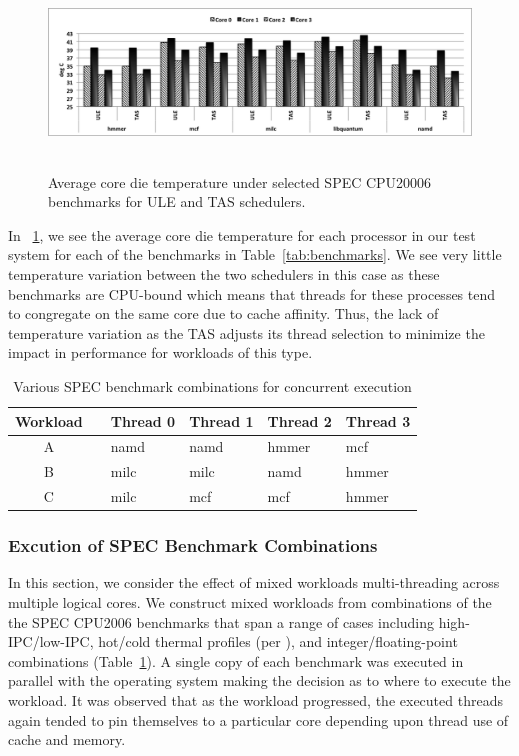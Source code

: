 \documentclass[times, 10pt,twocolumn]{IEEEtran}
\begin{document}
\begin{figure}[!tbhp] \centering
  \includegraphics[width=1.0\linewidth,height=2in]{graphics/speccputemp}
  \caption{Average core die temperature under selected SPEC CPU20006
benchmarks for ULE and TAS schedulers.}
  \label{fig:ubenchmarks}
\end{figure} 
In \figurename~\ref{fig:ubenchmarks}, we see the average
core die temperature for each processor in our test system for each of
the benchmarks in Table~\ref{tab:benchmarks}.  We see very little
temperature variation between the two schedulers in this case as these
benchmarks are CPU-bound which means that threads for these processes
tend to congregate on the same core due to cache affinity.  Thus, the
lack of temperature variation as the TAS adjusts its thread selection to
minimize the impact in performance for workloads of this type.

\begin{table}[bp]
  \caption{Various SPEC benchmark combinations for concurrent execution}
  \label{tab:crossbench} \centering
  \begin{tabular}{clllll} \hline Workload & & Thread 0 & Thread 1 &
Thread 2 & Thread 3 \\ \hline \hline A & & namd & namd & hmmer & mcf \\
B & & milc & milc & namd & hmmer \\ C & & milc & mcf & mcf & hmmer \\
\hline
  \end{tabular}
\end{table}
\subsubsection{Excution of SPEC Benchmark Combinations}
\label{sec:cross-funct-unit} In this section, we consider the effect of
mixed workloads multi-threading across multiple logical cores.  We
construct mixed workloads from combinations of the the SPEC CPU2006
benchmarks that span a range of cases including high-IPC/low-IPC,
hot/cold thermal profiles (per \cite{Kursun2008}), and
integer/floating-point combinations (Table~\ref{tab:crossbench}). A
single copy of each benchmark was executed in parallel with the
operating system making the decision as to where to execute the
workload.  It was observed that as the workload progressed, the executed
threads again tended to pin themselves to a particular core depending
upon thread use of cache and memory.
\end{document}
